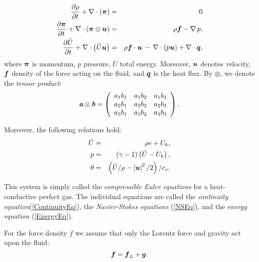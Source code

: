 \begin{eqnarray}
\label{ContinuityEq} \frac{\partial{\rho}}{\partial{t}} + \nabla\cdot\left(\mbox{\boldmath $\pi$}\right) & = & 0\\
\label{NSEq} \frac{\partial{\mbox{\boldmath $\pi$}}}{\partial{t}} + \nabla\cdot\left(\mbox{\boldmath $\pi$}\otimes\mbox{\boldmath $u$}\right)& = & \rho\mbox{\boldmath $f$} - \nabla\,p,\\
\label{EnergyEq} \frac{\partial{\tilde{U}}}{\partial{t}} + \nabla\cdot\left({\tilde{U}}\mbox{\boldmath $u$}\right) & = & \rho\mbox{\boldmath $f$}\cdot\mbox{\boldmath $u$} \,-\,\nabla\cdot\left({p}\mbox{\boldmath $u$}\right) + \nabla\cdot\mbox{\boldmath $q$},
\end{eqnarray}
where $\mbox{\boldmath $\pi$}$ is momentum, $p$ pressure, $U$ total energy. Moreover, $\mbox{\boldmath $u$}$ denotes velocity, $\mbox{\boldmath $f$}$ density of the force acting on the fluid, and $\mbox{\boldmath $q$}$ is the heat flux. By $\otimes$, we denote the \textit{tensor product}:
\begin{displaymath}
\textit{\textbf{a}}\otimes\textit{\textbf{b}} =
\left(
\begin{array}{ccc}
a_1b_1 & a_1b_2 & a_1b_3 \\
a_2b_1 & a_2b_2 & a_2b_3 \\
a_3b_1 & a_3b_2 & a_3b_3
\end{array}
\right).
\end{displaymath}

Moreover, the following relations hold:
\begin{eqnarray}
\tilde{U} & = & \rho e + U_k,\\
p & = & \left({}\gamma-1\right)\left({\tilde{U}}-U_k\right), \label{therm_1}\\
\theta & = & \left({\tilde{U}}/{\rho}-\left|\mbox{\boldmath $u$}\right|^2/2\right)/{c_v}.
\end{eqnarray}

This system is simply called the \textit{compressible Euler equations} for a heat-conductive perfect gas. The individual equations are called the \textit{continuity equation}(\ref{ContinuityEq}), the \textit{Navier-Stokes equations} (\ref{NSEq}), and the \textit{energy equation} (\ref{EnergyEq}).

For the force density $f$ we assume that only the Lorentz force and gravity act upon the fluid:
$$
\label{ForceEq} \mbox{\boldmath $f$} = \mbox{\boldmath $f$}_L + \mbox{\boldmath $g$}.
$$


